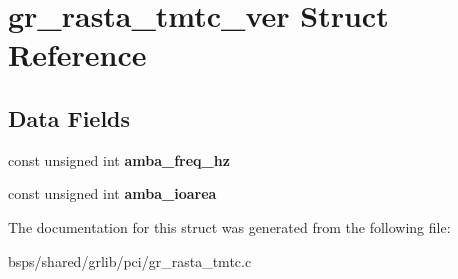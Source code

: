 \hypertarget{structgr__rasta__tmtc__ver}{}\section{gr\+\_\+rasta\+\_\+tmtc\+\_\+ver Struct Reference}
\label{structgr__rasta__tmtc__ver}
\subsection*{Data Fields}
\begin{DoxyCompactItemize}
\item 
\mbox{\label{structgr__rasta__tmtc__ver_af080d23a4bf1c76f948bb8a85b66d4b8}} 
const unsigned int {\bfseries amba\+\_\+freq\+\_\+hz}
\item 
\mbox{\label{structgr__rasta__tmtc__ver_a32ea602501d92f71ea9340264555e1c9}} 
const unsigned int {\bfseries amba\+\_\+ioarea}
\end{DoxyCompactItemize}


The documentation for this struct was generated from the following file\+:\begin{DoxyCompactItemize}
\item 
bsps/shared/grlib/pci/gr\+\_\+rasta\+\_\+tmtc.\+c\end{DoxyCompactItemize}
